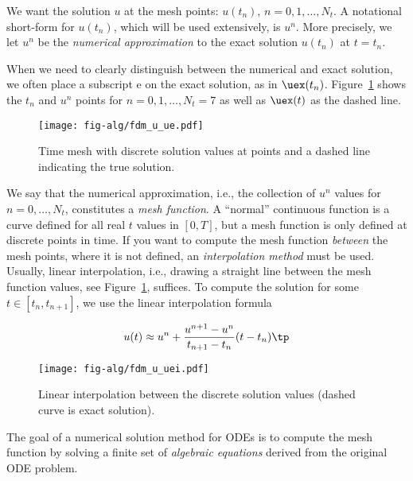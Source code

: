 \documentclass[graybox,sectrefs,envcountresetchap,open=right,final]{svmonodo}
\newenvironment{notice_mdfboxadmon}[1][]{
\begin{notice_mdfboxmdframed}[frametitle=#1]
}
{
\end{notice_mdfboxmdframed}
}
\begin{document}

We want the solution $u$ at the mesh points:
$u(t_n)$, $n=0,1,\ldots,N_t$.
A notational short-form for $u(t_n)$,
which will be used extensively, is $u^{n}$. More precisely, we let
$u^n$ be the \emph{numerical approximation} to the exact solution $u(t_n)$
at $t=t_n$.

When we need to clearly distinguish between the numerical and exact solution,
we often place a subscript e on the exact solution, as in $\uex(t_n)$.
Figure~\ref{decay:fdu:e} shows the $t_n$ and $u^n$ points for $n=0,1,\ldots,N_t=7$ as well as $\uex(t)$ as the dashed line.


\begin{figure}[!ht]  %
  \centerline{\texttt{[image: fig-alg/fdm\_u\_ue.pdf]}}
  \caption{
  Time mesh with discrete solution values at points and a dashed line indicating the true solution. \label{decay:fdu:e}
  }
\end{figure}



We say that the numerical approximation, i.e.,
the collection of $u^n$ values for $n=0,\ldots,N_t$,
constitutes a \emph{mesh function}.
A ``normal'' continuous function is a curve defined for all real $t$
values in $[0,T]$, but a mesh function is only defined at discrete
points in time. If you want to compute the mesh function \emph{between} the
mesh points, where it is not defined, an \emph{interpolation method} must be
used. Usually, linear interpolation, i.e., drawing a straight line between
the mesh function values, see Figure~\ref{decay:fdu:e}, suffices.
To compute the solution for some $t\in [t_n, t_{n+1}]$, we use the
linear interpolation formula

\begin{equation}
u(t) \approx u^n + \frac{u^{n+1}-u^n}{t_{n+1}-t_n}(t - t_n)\tp
\end{equation}


\begin{figure}[!ht]  %
  \centerline{\texttt{[image: fig-alg/fdm\_u\_uei.pdf]}}
  \caption{
  Linear interpolation between the discrete solution values (dashed curve is exact solution). \label{decay:fdu:ei}
  }
\end{figure}


\clearpage


\begin{notice_mdfboxadmon}[Notice]
The goal of a numerical solution method for ODEs is
to compute the mesh function by solving a finite set of
\emph{algebraic equations} derived from the original ODE problem.
\end{notice_mdfboxadmon}
\end{document}
